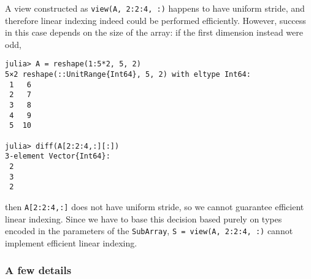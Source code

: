 A view constructed as \texttt{view(A, 2:2:4, :)} happens to have uniform stride, and therefore linear indexing indeed could be performed efficiently.  However, success in this case depends on the size of the array: if the first dimension instead were odd,




\begin{verbatim}
julia> A = reshape(1:5*2, 5, 2)
5×2 reshape(::UnitRange{Int64}, 5, 2) with eltype Int64:
 1   6
 2   7
 3   8
 4   9
 5  10

julia> diff(A[2:2:4,:][:])
3-element Vector{Int64}:
 2
 3
 2
\end{verbatim}



then \texttt{A[2:2:4,:]} does not have uniform stride, so we cannot guarantee efficient linear indexing.  Since we have to base this decision based purely on types encoded in the parameters of the \texttt{SubArray}, \texttt{S = view(A, 2:2:4, :)} cannot implement efficient linear indexing.



\hypertarget{6217885754113158897}{}


\subsubsection{A few details}



